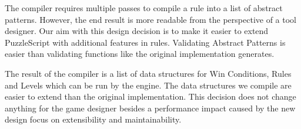The compiler requires multiple passes to compile a rule into a list of abstract patterns. However, the end result is more readable from the perspective of a tool designer. Our aim with this design decision is to make it easier to extend PuzzleScript with additional features in rules. Validating Abstract Patterns is easier than validating functions like the original implementation generates. 

The result of the compiler is a list of data structures for Win Conditions, Rules and Levels which can be run by the engine. The data structures we compile are easier to extend than the original implementation. This decision does not change anything for the game designer besides a performance impact caused by the new design focus on extensibility and maintainability. 
